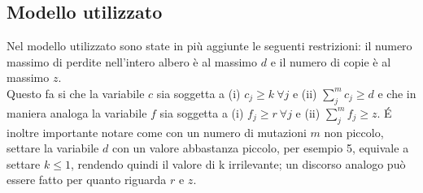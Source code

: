 \documentclass{report}
\begin{document}
  \subsection{Modello utilizzato}
  Nel modello utilizzato sono state in più aggiunte le seguenti restrizioni: il numero massimo di perdite nell'intero albero è al massimo $d$ e il numero di copie è al massimo $z$.\\
  Questo fa si che la variabile $c$ sia soggetta a (i) ${c}_{j}\geq k \ \forall j$ e (ii) $\sum_{j}^m {c}_{j} \geq d$ e che in maniera analoga la variabile $f$ sia soggetta a (i) ${f}_{j}\geq r \ \forall j$ e (ii) $\sum_{j}^m {f}_{j} \geq z$.
  \'E inoltre importante notare come con un numero di mutazioni $m$ non piccolo, settare la variabile $d$ con un valore abbastanza piccolo, per esempio 5, equivale a settare $k\leq 1$, rendendo quindi il valore di k irrilevante; un discorso analogo può essere fatto per quanto riguarda $r$ e $z$.
\end{document}

